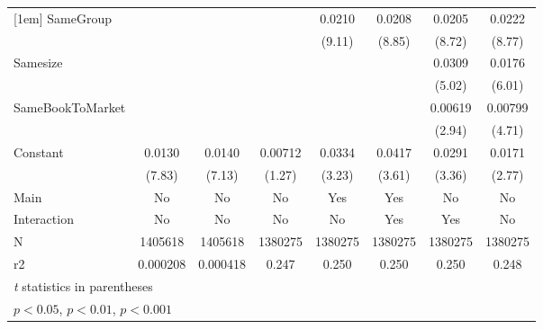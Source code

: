 {\begin{tabular}{l*{7}{c}}
[1em]
SameGroup           &                     &                     &                     &      0.0210\sym{***}&      0.0208\sym{***}&      0.0205\sym{***}&      0.0222\sym{***}\\
                    &                     &                     &                     &      (9.11)         &      (8.85)         &      (8.72)         &      (8.77)         \\
[1em]
Samesize            &                     &                     &                     &                     &                     &      0.0309\sym{***}&      0.0176\sym{***}\\
                    &                     &                     &                     &                     &                     &      (5.02)         &      (6.01)         \\
[1em]
SameBookToMarket    &                     &                     &                     &                     &                     &     0.00619\sym{**} &     0.00799\sym{***}\\
                    &                     &                     &                     &                     &                     &      (2.94)         &      (4.71)         \\
[1em]
Constant            &      0.0130\sym{***}&      0.0140\sym{***}&     0.00712         &      0.0334\sym{**} &      0.0417\sym{***}&      0.0291\sym{***}&      0.0171\sym{**} \\
                    &      (7.83)         &      (7.13)         &      (1.27)         &      (3.23)         &      (3.61)         &      (3.36)         &      (2.77)         \\
\hline
Main                &          No         &          No         &          No         &         Yes         &         Yes         &          No         &          No         \\
Interaction         &          No         &          No         &          No         &          No         &         Yes         &         Yes         &          No         \\
N                   &     1405618         &     1405618         &     1380275         &     1380275         &     1380275         &     1380275         &     1380275         \\
r2                  &    0.000208         &    0.000418         &       0.247         &       0.250         &       0.250         &       0.250         &       0.248         \\
\hline\hline
\multicolumn{8}{l}{\footnotesize \textit{t} statistics in parentheses}\\
\multicolumn{8}{l}{\footnotesize \sym{*} \(p<0.05\), \sym{**} \(p<0.01\), \sym{***} \(p<0.001\)}\\
\end{tabular}
}
